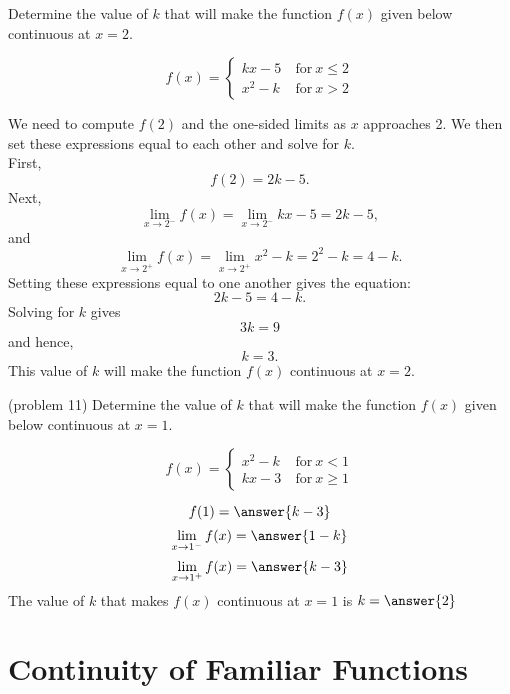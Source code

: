 \documentclass{ximera}
\begin{document}
\begin{example}[example 11]
Determine the value of $k$ that will make the function $f(x)$ given below 
continuous at $x = 2$.
 
\[f(x) = \left\{
     \begin{array}{lr}
       kx-5 & \ \text{for} \  x \leq 2 \\
			 x^2 - k & \ \text{for} \ x > 2
     \end{array}
   \right.
\]

We need to  compute $f(2)$ and the one-sided limits as $x$ approaches 2.
We then set these expressions equal to each other and solve for $k$.\\
First,
\[
f(2) = 2k-5.
\]
Next,
\[
\lim_{x \to 2^-} f(x) = \lim_{x \to 2^-} kx-5 = 2k-5,
\]
and
\[
\lim_{x \to 2^+} f(x) = \lim_{x \to 2^+} x^2 - k = 2^2 - k = 4 - k.
\]
Setting these expressions equal to one another gives the equation:
\[2k - 5 = 4 - k.\]
Solving for $k$ gives
\[3k = 9\]
and hence,
\[k = 3.\]
This value of $k$ will make the function $f(x)$ continuous at $x=2$.
\end{example}

\begin{problem}(problem 11)
Determine the value of $k$ that will make the function $f(x)$ given below 
continuous at $x = 1$.
 
\[f(x) = \left\{
     \begin{array}{lr}
        x^2 - k & \ \text{for} \  x < 1 \\
			 kx-3 & \ \text{for} \ x \geq 1
     \end{array}
   \right.
\]

\[
f(1) = \answer{k-3}
\]
\[
\lim_{x \to 1^-} f(x) = \answer{1-k}
\]
\[
\lim_{x \to 1^+} f(x) = \answer{k-3}
\]
The value of $k$ that makes $f(x)$ continuous at $x = 1$ is
$k = \answer{2}$
\end{problem}


\section{Continuity of Familiar Functions}
\end{document}
